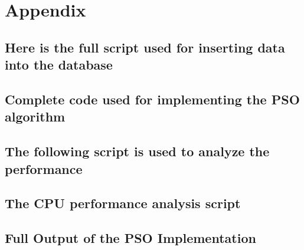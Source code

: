 \section{Appendix} %

\subsection{Here is the full script used for inserting data into the database}\vspace{.4cm}



\subsection{Complete code used for implementing the PSO algorithm}\vspace{.4cm}




 \vspace{.4cm}

\subsection{The following script is used to analyze the performance}\vspace{.4cm}


\subsection{The CPU performance analysis script}\vspace{.4cm}


\subsection{Full Output of the PSO Implementation}\vspace{.4cm}


